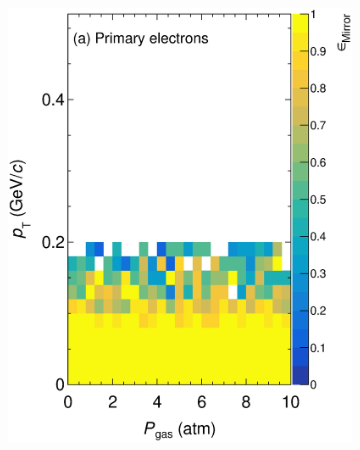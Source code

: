 \begin{figure}[!ht]
     \centering
     \begin{subfigure}[b]{0.32\textwidth}
         \centering
         \includegraphics[width=\textwidth]{figures/ch5-KF_NDGAr/ToySample/ParScan/testTPCMirrorMirrorRatioVSpTVSdens_e.eps}
         \caption{}
         \label{fig:MirrorRatiop_Prim_e}
     \end{subfigure}
     \begin{subfigure}[b]{0.32\textwidth}
         \centering

\end{subfigure}
\end{figure}
